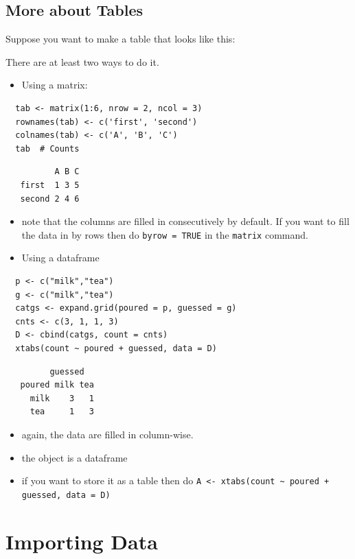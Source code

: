 \documentclass[captions=tableheading]{scrbook}
\begin{document}
\begin{example}
\subsection{More about Tables}
\label{sec-20-1-6}

Suppose you want to make a table that looks like this:

There are at least two ways to do it.

\begin{itemize}
\item Using a matrix:
\end{itemize}

\begin{verbatim}
  tab <- matrix(1:6, nrow = 2, ncol = 3)
  rownames(tab) <- c('first', 'second')
  colnames(tab) <- c('A', 'B', 'C')
  tab  # Counts
\end{verbatim}

\begin{verbatim}
          A B C
   first  1 3 5
   second 2 4 6
\end{verbatim}

\begin{itemize}
\item note that the columns are filled in consecutively by default. If you want to fill the data in by rows then do \texttt{byrow = TRUE} in the \texttt{matrix} command.
\item Using a dataframe
\end{itemize}

\begin{verbatim}
  p <- c("milk","tea")
  g <- c("milk","tea")
  catgs <- expand.grid(poured = p, guessed = g)
  cnts <- c(3, 1, 1, 3)
  D <- cbind(catgs, count = cnts)
  xtabs(count ~ poured + guessed, data = D)
\end{verbatim}

\begin{verbatim}
         guessed
   poured milk tea
     milk    3   1
     tea     1   3
\end{verbatim}

\begin{itemize}
\item again, the data are filled in column-wise.
\item the object is a dataframe
\item if you want to store it as a table then do \texttt{A <- xtabs(count \textasciitilde{} poured + guessed, data = D)}
\end{itemize}
\section{Importing Data}
\label{sec-20-2}
\label{sec-Importing-A-Data}



\end{example}
\end{document}
